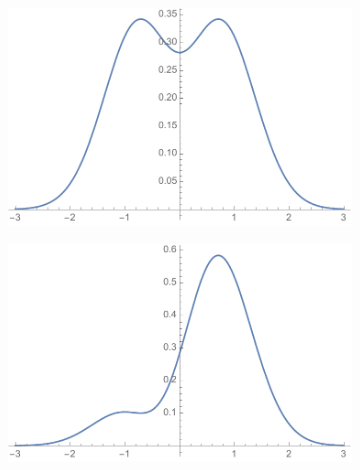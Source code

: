 \begin{enumerate}
\begin{figure}
    \vspace{1cm}
   \begin{subfigure}[t]{0.4\textwidth}   
        \centering
        \includegraphics[width=\linewidth]{Pictures/FigPsi2.pdf}
        \caption{} \label{fig:timingC}
    \end{subfigure}
    \hfill
    \begin{subfigure}[t]{0.4\textwidth}
        \centering
        \includegraphics[width=\linewidth]{Pictures/FigPsi1.pdf} 
        \caption{} 
        \label{fig:timingD}
    \end{subfigure}
    

\end{figure}
\end{enumerate}
